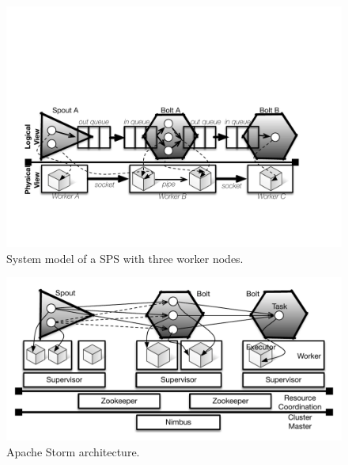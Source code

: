 \documentclass[letter]{vldb}
\begin{document}
\begin{figure}[h!]
	\begin{center}
		\includegraphics[width=\columnwidth]{figures/system-model}
		\caption{System model of a SPS with three worker nodes.}
		\label{fig:system-model}
	\end{center}
\end{figure}

\begin{figure}[h!]
	\begin{center}
		\includegraphics[width=0.9\columnwidth]{figures/storm-architecture}
					\vspace{-1em}
		\caption{Apache Storm architecture.}
		\label{fig:storm-arch}
	\end{center}
\end{figure}
\end{document}
